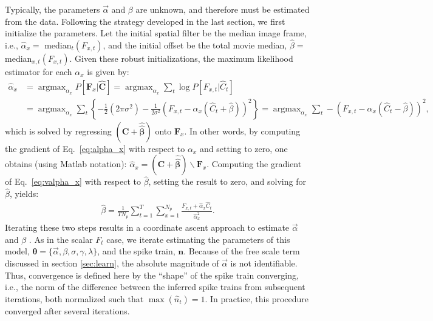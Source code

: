 \documentclass{article}
\providecommand{\ve}[1]{\boldsymbol{#1}}
\DeclareMathOperator*{\argmax}{argmax}
\newcommand{\bth}{\ve{\theta}}
\newcommand{\bn}{\ve{n}}
\newcommand{\bC}{\ve{C}}
\newcommand{\bF}{\ve{F}}
\newcommand{\hn}{\widehat{n}}
\newcommand{\hC}{\widehat{C}}
\newcommand{\hbC}{\widehat{\ve{C}}}
\newcommand{\sig}{\sigma}
\newcommand{\lam}{\lambda}
\newcommand{\gam}{\gamma}
\newcommand{\valpha}{\vec{\alpha}}
\newcommand{\hbbeta}{\widehat{\ve{\hbeta}}}
\newcommand{\halpha}{\widehat{\alpha}}
\newcommand{\hbeta}{\widehat{\beta}}
\begin{document}
Typically, the parameters  $\valpha$ and $\beta$ are unknown, and therefore must be estimated from the data.  Following the strategy developed in the last section, we first initialize the parameters.  Let the initial spatial filter be the median image frame, i.e., $\halpha_x=$ median$_t(F_{x,t})$, and the initial offset be the total movie median, $\hbeta=$ median$_{x,t}(F_{x,t})$.  Given these robust initializations, the maximum likelihood estimator for each $\alpha_x$ is given by:
\begin{subequations} \label{eq:valpha_x}
\begin{align}
\halpha_x &= \argmax_{\alpha_x} P[\bF_x | \hbC] = \argmax_{\alpha_x} \sum_t \log P[F_{x,t} | \hC_t] \\
&=\argmax_{\alpha_x} \sum_t  \left\{-\frac{1}{2} (2\pi \sig^2) - \frac{1}{2\sig^2}\left(F_{x,t} - \alpha_x (\hC_t + \hbeta)\right)^2 \right\} %
= \argmax_{\alpha_x} \sum_t - (F_{x,t} - \alpha_x(\hC_t - \hbeta))^2, \label{eq:alpha_x}
\end{align}
\end{subequations}
which is solved by regressing $(\bC + \hbbeta)$ onto $\bF_x$.  In other words, by computing the gradient of Eq.~\eqref{eq:alpha_x} with respect to $\alpha_x$ and setting to zero, one obtains (using Matlab notation): $\halpha_x = (\bC + \hbbeta)\backslash \bF_x$. %
Computing the gradient of Eq.~\eqref{eq:valpha_x} with respect to $\hbeta$, setting the result to zero, and solving for $\hbeta$, yields:
\begin{align} \label{eq:beta}
	\hbeta = \frac{1}{T N_p} \sum_{t=1}^T \sum_{x=1}^{N_p} \frac{F_{x,t} + \halpha_x  \hC_t}{\halpha_x^2}.
\end{align} 
Iterating these two steps results in a coordinate ascent approach to estimate $\valpha$ and $\beta$ \cite{CONV04}. As in the scalar $F_t$ case, we iterate estimating the parameters of this model, $\bth = \{\valpha, \beta, \sig, \gam, \lam\}$, and the spike train, $\bn$.  Because of the free scale term discussed in section \ref{sec:learn}, the absolute magnitude of $\valpha$ is not identifiable.  Thus, convergence is defined here by the ``shape'' of the spike train converging, i.e., the norm of the difference between the inferred spike trains from subsequent iterations, both normalized such that $\max(\hn_t)=1$.  In practice, this procedure converged after several iterations.
\end{document}
